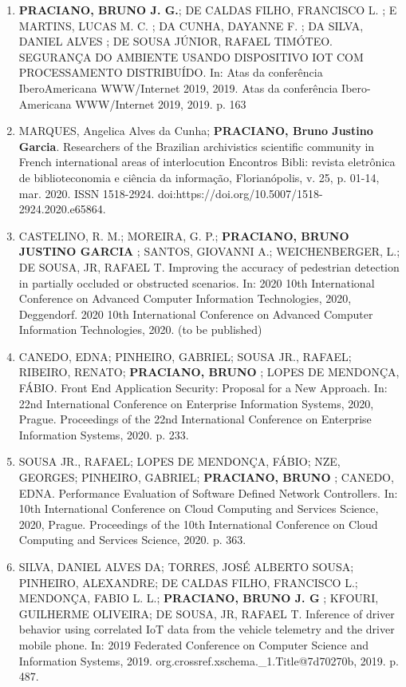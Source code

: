 \begin{enumerate}

\item \textbf{PRACIANO, BRUNO J. G.}; DE CALDAS FILHO, FRANCISCO L. ; E MARTINS, LUCAS M. C. ; DA CUNHA, DAYANNE F. ; DA SILVA, DANIEL ALVES ; DE SOUSA JÚNIOR, RAFAEL TIMÓTEO. SEGURANÇA DO AMBIENTE USANDO DISPOSITIVO IOT COM PROCESSAMENTO DISTRIBUÍDO. In: Atas da conferência IberoAmericana WWW/Internet 2019, 2019. Atas da conferência Ibero-Americana WWW/Internet 2019, 2019. p. 163

\item MARQUES, Angelica Alves da Cunha; \textbf{PRACIANO, Bruno Justino Garcia}. Researchers of the Brazilian archivistics scientific community in French international areas of interlocution Encontros Bibli: revista eletrônica de biblioteconomia e ciência da informação, Florianópolis, v. 25, p. 01-14, mar. 2020. ISSN 1518-2924. doi:https://doi.org/10.5007/1518-2924.2020.e65864.

\item CASTELINO, R. M.; MOREIRA, G. P.; \textbf{PRACIANO, BRUNO JUSTINO GARCIA} ; SANTOS, GIOVANNI A.; WEICHENBERGER, L.; DE SOUSA, JR, RAFAEL T. Improving the accuracy of pedestrian detection in partially occluded or obstructed scenarios. In: 2020 10th International Conference on Advanced Computer Information Technologies, 2020, Deggendorf. 2020 10th International Conference on Advanced Computer Information Technologies, 2020. (to be published)

\item CANEDO, EDNA; PINHEIRO, GABRIEL; SOUSA JR., RAFAEL; RIBEIRO, RENATO; \textbf{PRACIANO, BRUNO} ; LOPES DE MENDONÇA, FÁBIO. Front End Application Security: Proposal for a New Approach. In: 22nd International Conference on Enterprise Information Systems, 2020, Prague. Proceedings of the 22nd International Conference on Enterprise Information Systems, 2020. p. 233.

\item SOUSA JR., RAFAEL; LOPES DE MENDONÇA, FÁBIO; NZE, GEORGES; PINHEIRO, GABRIEL; \textbf{PRACIANO, BRUNO }; CANEDO, EDNA. Performance Evaluation of Software Defined Network Controllers. In: 10th International Conference on Cloud Computing and Services Science, 2020, Prague. Proceedings of the 10th International Conference on Cloud Computing and Services Science, 2020. p. 363.


\item SILVA, DANIEL ALVES DA; TORRES, JOSÉ ALBERTO SOUSA; PINHEIRO, ALEXANDRE; DE CALDAS FILHO, FRANCISCO L.; MENDONÇA, FABIO L. L.; \textbf{PRACIANO, BRUNO J. G} ; KFOURI, GUILHERME OLIVEIRA; DE SOUSA, JR, RAFAEL T. Inference of driver behavior using correlated IoT data from the vehicle telemetry and the driver mobile phone. In: 2019 Federated Conference on Computer Science and Information Systems, 2019. org.crossref.xschema.\_1.Title@7d70270b, 2019. p. 487.


\end{enumerate}

